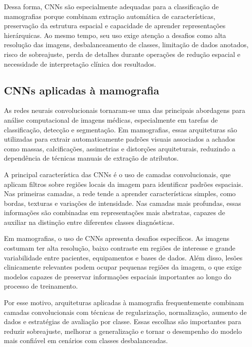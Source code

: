 \documentclass[
    12pt,
    openright,
    oneside,
    a4paper,
    english,
    brazil
]{abntex2}
\begin{document}
Dessa forma, CNNs são especialmente adequadas para a classificação de mamografias porque combinam extração automática de características, preservação da estrutura espacial e capacidade de aprender representações hierárquicas. Ao mesmo tempo, seu uso exige atenção a desafios como alta resolução das imagens, desbalanceamento de classes, limitação de dados anotados, risco de sobreajuste, perda de detalhes durante operações de redução espacial e necessidade de interpretação clínica dos resultados.

\subsection{CNNs aplicadas à mamografia}

As redes neurais convolucionais tornaram-se uma das principais abordagens para análise computacional de imagens médicas, especialmente em tarefas de classificação, detecção e segmentação. Em mamografias, essas arquiteturas são utilizadas para extrair automaticamente padrões visuais associados a achados como massas, calcificações, assimetrias e distorções arquiteturais, reduzindo a dependência de técnicas manuais de extração de atributos.

A principal característica das CNNs é o uso de camadas convolucionais, que aplicam filtros sobre regiões locais da imagem para identificar padrões espaciais. Nas primeiras camadas, a rede tende a aprender características simples, como bordas, texturas e variações de intensidade. Nas camadas mais profundas, essas informações são combinadas em representações mais abstratas, capazes de auxiliar na distinção entre diferentes classes diagnósticas.

Em mamografias, o uso de CNNs apresenta desafios específicos. As imagens costumam ter alta resolução, baixo contraste em regiões de interesse e grande variabilidade entre pacientes, equipamentos e bases de dados. Além disso, lesões clinicamente relevantes podem ocupar pequenas regiões da imagem, o que exige modelos capazes de preservar informações espaciais importantes ao longo do processo de treinamento.

Por esse motivo, arquiteturas aplicadas à mamografia frequentemente combinam camadas convolucionais com técnicas de regularização, normalização, aumento de dados e estratégias de avaliação por classe. Essas escolhas são importantes para reduzir sobreajuste, melhorar a generalização e tornar o desempenho do modelo mais confiável em cenários com classes desbalanceadas.
\end{document}
